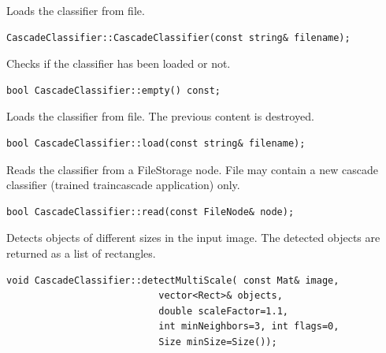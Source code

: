 Loads the classifier from file.

\begin{lstlisting}
CascadeClassifier::CascadeClassifier(const string& filename);
\end{lstlisting}

\begin{description}
\end{description}

Checks if the classifier has been loaded or not.

\begin{lstlisting}
bool CascadeClassifier::empty() const;
\end{lstlisting}

Loads the classifier from file. The previous content is destroyed.

\begin{lstlisting}
bool CascadeClassifier::load(const string& filename);
\end{lstlisting}

\begin{description}
\end{description}

Reads the classifier from a FileStorage node. File may contain a new cascade classifier (trained traincascade application) only.

\begin{lstlisting}
bool CascadeClassifier::read(const FileNode& node);
\end{lstlisting}

Detects objects of different sizes in the input image. The detected objects are returned as a list of rectangles.

\begin{lstlisting}
void CascadeClassifier::detectMultiScale( const Mat& image,
                           vector<Rect>& objects,
                           double scaleFactor=1.1,
                           int minNeighbors=3, int flags=0,
                           Size minSize=Size());
\end{lstlisting}

